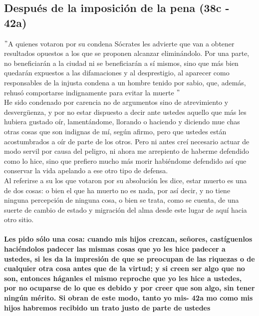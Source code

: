 \begin{multicols}{2}
\section*{\center Después de la imposición de la pena (38c - 42a)}
$"$A quienes votaron por su condena Sócrates les advierte que van a obtener resultados opuestos a los que se proponen alcanzar eliminándolo. Por una parte, no beneficiarán a la ciudad ni se beneficiarán a sí mismos, sino que más bien quedarán expuestos a las difamaciones y al desprestigio, al aparecer como responsables de la injusta condena a un hombre tenido por sabio, que, además, rehusó comportarse indignamente para evitar la muerte $"$\\
He sido condenado por carencia no de argumentos sino de atrevimiento y desvergüenza, y por no estar dispuesto a decir ante ustedes aquello que más les hubiera gustado oír, lamentándome, llorando o haciendo y diciendo mue chas otras cosas que son indignas de mí, según afirmo, pero que ustedes están acostumbrados a oír de parte de los otros. Pero ni antes creí necesario actuar de modo servil por causa del peligro, ni ahora me arrepiento de haberme defendido como lo hice, sino que prefiero mucho más morir habiéndome defendido así que conservar la vida apelando a ese otro tipo de defensa.\\
Al referirse a su los que votaron por su absolución les dice, estar muerto es una de dos cosas: o bien el que ha muerto no es nada, por así decir, y no tiene ninguna percepción de ninguna cosa, o bien se trata, como se cuenta, de una suerte de cambio de estado y migración del alma desde este lugar de aquí hacia otro sitio.\\\\
\textbf{Les pido sólo una cosa: cuando mis hijos crezcan, señores, castíguenlos haciéndolos padecer las mismas cosas que yo les hice padecer a ustedes, si les da la impresión de que se preocupan de las riquezas o de cualquier otra cosa antes que de la virtud; y si creen ser algo que no son, entonces háganles el mismo reproche que yo les hice a ustedes, por no ocuparse de lo que es debido y por creer que son algo, sin tener ningún mérito. Si obran de este modo, tanto yo mis- 42a mo como mis hijos habremos recibido un trato justo de parte de ustedes}


\end{multicols}
